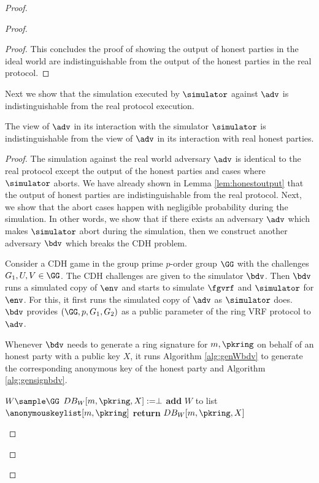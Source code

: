 \begin{proof}
\begin{proof}
\begin{proof}
			This concludes the proof of showing the output of honest parties in the ideal world are indistinguishable from the output of the honest parties in the real protocol.
		\end{proof}	
		
		Next we show that the simulation executed by $ \simulator $ against $ \adv $ is indistinguishable from the real protocol execution.
		
		\begin{lemma} 
			The view of $ \adv $ in its interaction with the simulator $ \simulator $ is indistinguishable from the view of $ \adv $ in its interaction with real honest parties.
		\end{lemma}
		
		
		\begin{proof}
			The  simulation against the real world adversary $ \adv $ is identical to the real protocol except the output of the honest parties and cases where $ \simulator $ aborts. We have already shown in Lemma \ref{lem:honestoutput} that the output of honest parties are indistinguishable from the real protocol. Next, we show that the abort cases happen with negligible probability during the simulation. In other words, we show that if there exists an adversary $ \adv $ which makes $ \simulator $ abort during the simulation, then we construct another adversary $ \bdv $ which breaks the CDH problem. 
			
			Consider a CDH game in the group prime $ p $-order group  $ \GG $ with the challenges $ G_1,U, V \in \GG$. The CDH challenges are given to the simulator $ \bdv $. Then $ \bdv $ runs a simulated copy of $ \env $ and starts to simulate $ \fgvrf $ and $ \simulator $ for $ \env $. For this, it first runs the simulated copy of $ \adv $ as $ \simulator $ does. $ \bdv $ provides $ (\GG, p, G_1 , G_2) $ as a public parameter of the ring VRF protocol to $ \adv $.
			
			Whenever $ \bdv $ needs to generate a ring signature for $ m, \pkring $ on behalf of an honest party with a public key $ X $, it runs  Algorithm \ref{alg:genWbdv} to generate the corresponding anonymous key of the honest party and Algorithm \ref{alg:gensignbdv}. 
			
			\begin{algorithm}
				\caption{$\gen_{W}(\pkring,X, m)$}
				\label{alg:genWbdv}	 	
				\begin{algorithmic}[1]
					\State $ W \sample \GG$
					\State $ DB_W[m,\pkring, X] := \perp $
					\State \textbf{add} $ W $ to list $ \anonymouskeylist[m,\pkring] $
					\EndIf
					\State \textbf{return} $ DB_W[m,\pkring, X] $
				\end{algorithmic}
			\end{algorithm}
			

\end{proof}
\end{proof}
\end{proof}
